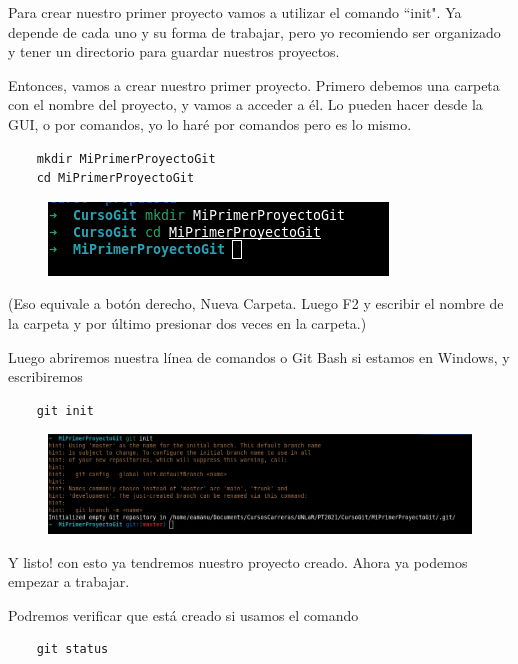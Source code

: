 \documentclass[a4paper]{article}
\begin{document}
Para crear nuestro primer proyecto vamos a utilizar el comando ``init".
Ya depende de cada uno y su forma de trabajar, pero yo recomiendo ser organizado
y tener un directorio para guardar nuestros proyectos.

Entonces, vamos a crear nuestro primer proyecto. Primero debemos una carpeta con
el nombre del proyecto, y vamos a acceder a él. Lo pueden hacer desde la GUI, o 
por comandos, yo lo haré por comandos pero es lo mismo.

\begin{verbatim}
	mkdir MiPrimerProyectoGit
	cd MiPrimerProyectoGit
\end{verbatim}

\begin{figure}[H]
	\centering
	\includegraphics[width=0.7\linewidth]{img/miprimerproyecto}
	\label{fig:miprimerproyecto}
\end{figure}

(Eso equivale a botón derecho, Nueva Carpeta. Luego F2 y escribir el nombre
de la carpeta y por último presionar dos veces en la carpeta.)

Luego abriremos nuestra línea de comandos o Git Bash si estamos en Windows, y
escribiremos

\begin{verbatim}
	git init
\end{verbatim}

\begin{figure}[H]
	\centering
	\includegraphics[width=0.7\linewidth]{img/miprimerproyecto2}
	\label{fig:miprimerproyecto2}
\end{figure}

Y listo! con esto ya tendremos nuestro proyecto creado. Ahora ya podemos empezar
a trabajar.

Podremos verificar que está creado si usamos el comando

\begin{verbatim}
	git status
\end{verbatim}
\end{document}
